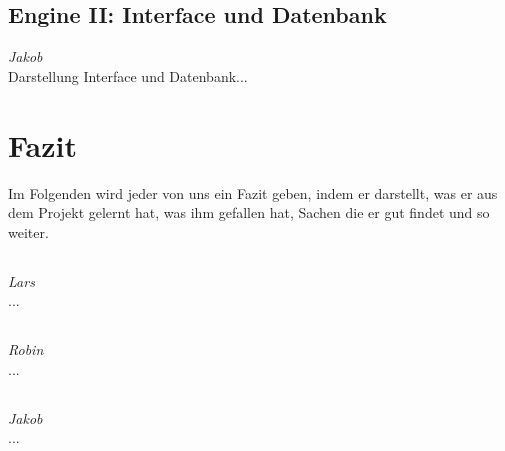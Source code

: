 \documentclass[12pt,a4paper,bibliography=totocnumbered,listof=totocnumbered]{scrartcl}
\begin{document}
\subsection{Engine II: Interface und Datenbank}
\emph{Jakob}\\
Darstellung Interface und Datenbank...
\pagebreak
\section{Fazit}
Im Folgenden wird jeder von uns ein Fazit geben, indem er darstellt, was er aus dem Projekt gelernt hat, was ihm gefallen hat, Sachen die er gut findet und so weiter.

\subsection{}
\emph{Lars}\\
...

\subsection{}
\emph{Robin}\\
...

\subsection{}
\emph{Jakob}\\
...

\pagebreak

\end{document}
